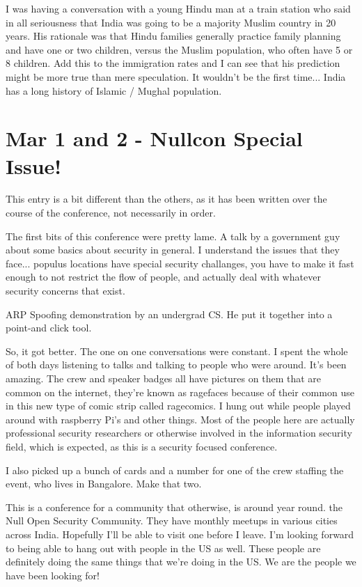 \documentclass[11pt]{amsart}
\begin{document}
I was having a conversation with a young Hindu man at a train station who said in all seriousness that India was going to be a majority Muslim country in 20 years. His rationale was that Hindu families generally practice family planning and have one or two children, versus the Muslim population, who often have 5 or 8 children. Add this to the immigration rates and I can see that his prediction might be more true than mere speculation. It wouldn't be the first time...  India has a long history of Islamic / Mughal population.

\section{Mar 1 and 2 - Nullcon Special Issue!}

This entry is a bit different than the others, as it has been written over the course of the conference, not necessarily in order.

The first bits of this conference were pretty lame. A talk by a government guy about some basics about security in general. I understand the issues that they face...  populus locations have special security challanges, you have to make it fast enough to not restrict the flow of people, and actually deal with whatever security concerns that exist.

ARP Spoofing demonstration by an undergrad CS. He put it together into a point-and click tool.

So, it got better. The one on one conversations were constant. I spent the whole of both days listening to talks and talking to people who were around. It's been amazing. The crew and speaker badges all have pictures on them that are common on the internet, they're known as ragefaces because of their common use in this new type of comic strip called ragecomics. I hung out while people played around with raspberry Pi's and other things. Most of the people here are actually professional security researchers or otherwise involved in the information security field, which is expected, as this is a security focused conference.

I also picked up a bunch of cards and a number for one of the crew staffing the event, who lives in Bangalore. Make that two.

This is a conference for a community that otherwise, is around year round. the Null Open Security Community. They have monthly meetups in various cities across India. Hopefully I'll be able to visit one before I leave. I'm looking forward to being able to hang out with people in the US as well. These people are definitely doing the same things that we're doing in the US. We are the people we have been looking for!
\end{document}
